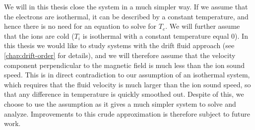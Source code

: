 We will in this thesis close the system in a much simpler way.
If we assume that the electrons are isothermal, it can be described by a constant temperature, and hence there is no need for an equation to solve for $T_e$.
We will further assume that the ions are cold ($T_i$ is isothermal with a constant temperature equal $0$).
In this thesis we would like to study systems with the drift fluid approach (see \cref{chap:drift-order} for details), and we will therefore assume that the velocity component perpendicular to the magnetic field is much less than the ion sound speed.
This is in direct contradiction to our assumption of an isothermal system, which requires that the fluid velocity is much larger than the ion sound speed, so that any difference in temperature is quickly smoothed out.
Despite of this, we choose to use the assumption as it gives a much simpler system to solve and analyze.
Improvements to this crude approximation is therefore subject to future work.
